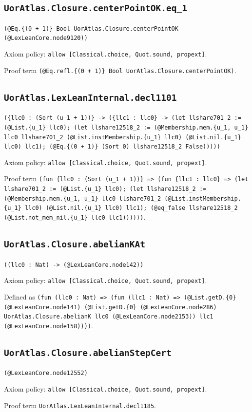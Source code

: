 \documentclass[11pt]{article}
\begin{document}
\subsection*{\texttt{UorAtlas.Closure.centerPointOK.eq\_1}}
\noindent\texttt{(@Eq.\{(0 + 1)\} Bool UorAtlas.Closure.centerPointOK (@LexLeanCore.node9120))}\par
\noindent Axiom policy: \texttt{allow [Classical.choice, Quot.sound, propext]}.\par
\noindent Proof term \texttt{(@Eq.refl.\{(0 + 1)\} Bool UorAtlas.Closure.centerPointOK)}.\par
\subsection*{\texttt{UorAtlas.LexLeanInternal.decl1101}}
\noindent\texttt{(\{llc0 : (Sort (u\_1 + 1))\} -> (\{llc1 : llc0\} -> (let llshare701\_2 := (@List.\{u\_1\} llc0); (let llshare12518\_2 := (@Membership.mem.\{u\_1, u\_1\} llc0 llshare701\_2 (@List.instMembership.\{u\_1\} llc0) (@List.nil.\{u\_1\} llc0) llc1); (@Eq.\{(0 + 1)\} (Sort 0) llshare12518\_2 False)))))}\par
\noindent Axiom policy: \texttt{allow [Classical.choice, Quot.sound, propext]}.\par
\noindent Proof term \texttt{(fun \{llc0 : (Sort (u\_1 + 1))\} => (fun \{llc1 : llc0\} => (let llshare701\_2 := (@List.\{u\_1\} llc0); (let llshare12518\_2 := (@Membership.mem.\{u\_1, u\_1\} llc0 llshare701\_2 (@List.instMembership.\{u\_1\} llc0) (@List.nil.\{u\_1\} llc0) llc1); (@eq\_false llshare12518\_2 (@List.not\_mem\_nil.\{u\_1\} llc0 llc1))))))}.\par
\subsection*{\texttt{UorAtlas.Closure.abelianKAt}}
\noindent\texttt{((llc0 : Nat) -> (@LexLeanCore.node142))}\par
\noindent Axiom policy: \texttt{allow [Classical.choice, Quot.sound, propext]}.\par
\noindent Defined as \texttt{(fun (llc0 : Nat) => (fun (llc1 : Nat) => (@List.getD.\{0\} (@LexLeanCore.node141) (@List.getD.\{0\} (@LexLeanCore.node286) UorAtlas.Closure.abelianK llc0 (@LexLeanCore.node2153)) llc1 (@LexLeanCore.node158))))}.\par
\subsection*{\texttt{UorAtlas.Closure.abelianStepCert}}
\noindent\texttt{(@LexLeanCore.node12552)}\par
\noindent Axiom policy: \texttt{allow [Classical.choice, Quot.sound, propext]}.\par
\noindent Proof term \texttt{UorAtlas.LexLeanInternal.decl1185}.\par
\end{document}
